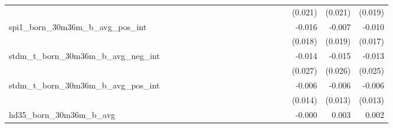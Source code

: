 \begin{tabular}{lrrrrrrrrrrrrrrrrrr}
                                            &              &              &              &              &              &              &              &              &               &              &              &               &              &              &               &      (0.021) &      (0.021) &       (0.019) \\ 
spi1\_born\_30m36m\_b\_avg\_pos\_int        &              &              &              &              &              &              &              &              &               &              &              &               &              &              &               &       -0.016 &       -0.007 &        -0.010 \\ 
                                            &              &              &              &              &              &              &              &              &               &              &              &               &              &              &               &      (0.018) &      (0.019) &       (0.017) \\ 
stdm\_t\_born\_30m36m\_b\_avg\_neg\_int     &              &              &              &              &              &              &              &              &               &              &              &               &              &              &               &       -0.014 &       -0.015 &        -0.013 \\ 
                                            &              &              &              &              &              &              &              &              &               &              &              &               &              &              &               &      (0.027) &      (0.026) &       (0.025) \\ 
stdm\_t\_born\_30m36m\_b\_avg\_pos\_int     &              &              &              &              &              &              &              &              &               &              &              &               &              &              &               &       -0.006 &       -0.006 &        -0.006 \\ 
                                            &              &              &              &              &              &              &              &              &               &              &              &               &              &              &               &      (0.014) &      (0.013) &       (0.013) \\ 
hd35\_born\_30m36m\_b\_avg                  &              &              &              &              &              &              &              &              &               &              &              &               &              &              &               &       -0.000 &        0.003 &         0.002 \\ 

\end{tabular}
